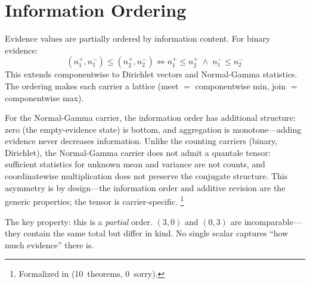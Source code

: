\documentclass[11pt,openany]{report}
\begin{document}
\section{Information Ordering}

Evidence values are partially ordered by information content.  For
binary evidence:
\[
  (n_1^+, n_1^-) \le (n_2^+, n_2^-) \iff
  n_1^+ \le n_2^+ \;\wedge\; n_1^- \le n_2^-
\]
This extends componentwise to Dirichlet vectors and Normal-Gamma
statistics.  The ordering makes each carrier a lattice (meet $=$
componentwise min, join $=$ componentwise max).

For the Normal-Gamma carrier, the information order has additional
structure: zero (the empty-evidence state) is bottom, and
aggregation is monotone---adding evidence never decreases
information.  Unlike the counting carriers (binary, Dirichlet),
the Normal-Gamma carrier does not admit a quantale tensor:
sufficient statistics for unknown mean and variance are not
counts, and coordinatewise multiplication does not preserve the
conjugate structure.  This asymmetry is by design---the
information order and additive revision are the generic
properties; the tensor is carrier-specific.%
\footnote{Formalized in
(10~theorems, 0~sorry).}

The key property: this is a \emph{partial} order.  $(3, 0)$ and
$(0, 3)$ are incomparable---they contain the same total but differ in
kind.  No single scalar captures ``how much evidence'' there is.
\end{document}
